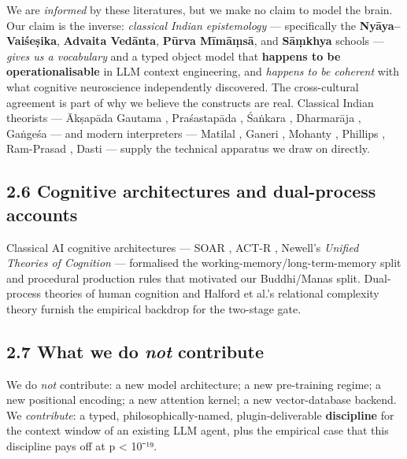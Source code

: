 We are \emph{informed} by these literatures, but we make no claim to model the brain. Our claim is the inverse: \emph{classical Indian epistemology} --- specifically the \textbf{Nyāya--Vaiśeṣika}, \textbf{Advaita Vedānta}, \textbf{Pūrva Mīmāṃsā}, and \textbf{Sāṃkhya} schools --- \emph{gives us a vocabulary} and a typed object model that \textbf{happens to be operationalisable} in LLM context engineering, and \emph{happens to be coherent} with what cognitive neuroscience independently discovered. The cross-cultural agreement is part of why we believe the constructs are real. Classical Indian theorists --- Ākṣapāda Gautama \citep{aksapada200nyayasutra}, Praśastapāda \citep{prasastapada6padarthadharma}, Śaṅkara \citep{sankaraupadesha}, Dharmarāja \citep{dharmaraja17vedantaparibhasa}, Gaṅgeśa \citep{gangesa14tattvacintamani} --- and modern interpreters --- Matilal \citep{matilal1986perception, matilal1968navyanyaya}, Ganeri \citep{ganeri2001philosophy, ganeri2017concealed}, Mohanty \citep{mohanty1992reason}, Phillips \citep{phillips2012epistemology, phillips1997classical}, Ram-Prasad \citep{ramprasad2013advaita, ram2007error}, Dasti \citep{dasti2008jayanta} --- supply the technical apparatus we draw on directly.

\subsection{2.6 Cognitive architectures and dual-process accounts}\label{cognitive-architectures-and-dual-process-accounts}

Classical AI cognitive architectures --- SOAR \citep{laird1987soar}, ACT-R \citep{anderson1996actr}, Newell's \emph{Unified Theories of Cognition} \citep{newell1990unified} --- formalised the working-memory/long-term-memory split and procedural production rules that motivated our Buddhi/Manas split. Dual-process theories of human cognition \citep{evans2003duality, kahneman2011thinking, sloman1996two, stanovich2000individual, epstein1994integration} and Halford et al.'s relational complexity theory \citep{halford1998processing} furnish the empirical backdrop for the two-stage gate.

\subsection{\texorpdfstring{2.7 What we do \emph{not} contribute}{2.7 What we do not contribute}}\label{what-we-do-not-contribute}

We do \emph{not} contribute: a new model architecture; a new pre-training regime; a new positional encoding; a new attention kernel; a new vector-database backend. We \emph{contribute}: a typed, philosophically-named, plugin-deliverable \textbf{discipline} for the context window of an existing LLM agent, plus the empirical case that this discipline pays off at p \textless{} 10⁻¹⁹.
